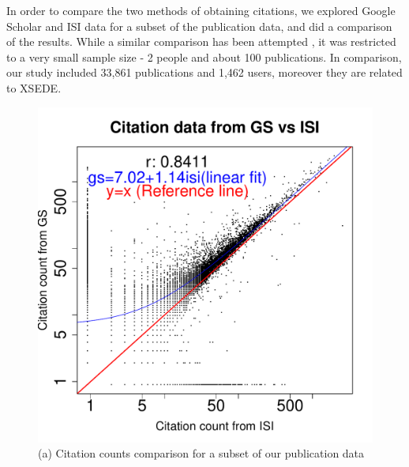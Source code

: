 \documentclass{tex/sig-alternate}
\begin{document}
In order to compare the two methods of obtaining citations, we explored Google Scholar and ISI data for a subset of the publication data, and did a comparison of the results. While a similar comparison has been attempted \cite{yang2006citation}, it was restricted to a very small sample size - 2 people and about 100 publications. In comparison, our study included 33,861 publications and 1,462 users, moreover they are related to XSEDE.


\begin{figure}[!htb] 
\begin{minipage}[t]{0.22\textwidth}
  \centering 
    \includegraphics[width=1.0\columnwidth]{images/11_gs_vs_isi_cites_bigfont.pdf} 
    (a) Citation counts comparison for a subset of our publication data
\ \
\end{minipage}
\begin{minipage}[t]{0.22\textwidth}
  \centering 

\end{minipage}
\end{figure}
\end{document}
